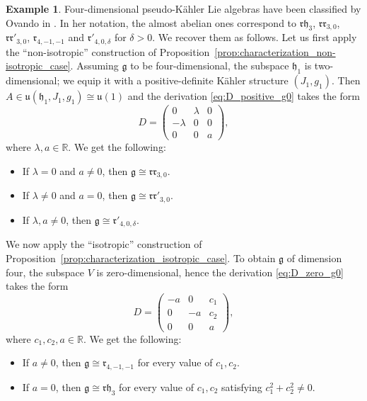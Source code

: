 \documentclass{article}
\theoremstyle{definition}
\newtheorem{example}[theorem]{Example}
\newcommand{\R}{\mathbb{R}}
\newcommand{\frg}{\mathfrak{g}}
\newcommand{\frh}{\mathfrak{h}}
\begin{document}
\begin{example}\label{example:4d}
    Four-dimensional pseudo-Kähler Lie algebras have been classified by Ovando in \cite{Ova06}. In her notation, the almost abelian ones correspond to $\mathfrak{rh}_3$, $\mathfrak{rr}_{3,0}$, $\mathfrak{rr}'_{3,0}$, $\mathfrak{r}_{4,-1,-1}$ and $\mathfrak{r}'_{4,0,\delta}$ for $\delta>0$. We recover them as follows. Let us first apply the ``non-isotropic'' construction of Proposition~\ref{prop:characterization_non-isotropic_case}. Assuming $\frg$ to be four-dimensional, the subspace $\frh_1$ is two-dimensional; we equip it with a positive-definite Kähler structure $(J_1,g_1)$. Then $A\in\mathfrak{u}(\frh_1,J_1,g_1)\cong\mathfrak{u}(1)$ and the derivation \eqref{eq:D_positive_g0} takes the form $$D=\begin{pmatrix}
        0&\lambda&0\\
        -\lambda&0&0\\
        0&0&a
    \end{pmatrix},$$ where $\lambda,a\in\R$. We get the following: \begin{itemize}
        \item If $\lambda=0$ and $a\neq0$, then $\frg\cong\mathfrak{rr}_{3,0}$.
        \item If $\lambda\neq0$ and $a=0$, then $\frg\cong\mathfrak{rr}'_{3,0}$.
        \item If $\lambda,a\neq0$, then $\frg\cong\mathfrak{r}'_{4,0,\delta}$.
    \end{itemize}

    We now apply the ``isotropic'' construction of Proposition~\ref{prop:characterization_isotropic_case}. To obtain $\frg$ of dimension four, the subspace $V$ is zero-dimensional, hence the derivation \eqref{eq:D_zero_g0} takes the form $$D=\begin{pmatrix}
        -a&0&c_1\\
        0&-a&c_2\\
        0&0&a
    \end{pmatrix},$$ where $c_1,c_2,a\in\R$. We get the following: \begin{itemize}
        \item If $a\neq0$, then $\frg\cong\mathfrak{r}_{4,-1,-1}$ for every value of $c_1,c_2$.
        \item If $a=0$, then $\frg\cong\mathfrak{rh}_3$ for every value of $c_1,c_2$ satisfying $c_1^2+c_2^2\neq0$.
    \end{itemize}
\end{example}
\end{document}
